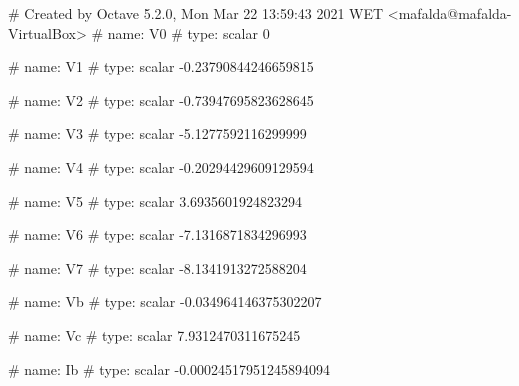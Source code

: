 # Created by Octave 5.2.0, Mon Mar 22 13:59:43 2021 WET <mafalda@mafalda-VirtualBox>
# name: V0
# type: scalar
0


# name: V1
# type: scalar
-0.23790844246659815


# name: V2
# type: scalar
-0.73947695823628645


# name: V3
# type: scalar
-5.1277592116299999


# name: V4
# type: scalar
-0.20294429609129594


# name: V5
# type: scalar
3.6935601924823294


# name: V6
# type: scalar
-7.1316871834296993


# name: V7
# type: scalar
-8.1341913272588204


# name: Vb
# type: scalar
-0.034964146375302207


# name: Vc
# type: scalar
7.9312470311675245


# name: Ib
# type: scalar
-0.00024517951245894094


